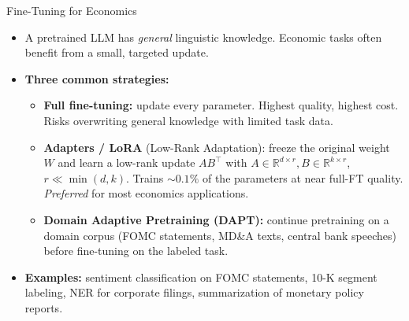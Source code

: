 \documentclass[10pt,english,aspectratio=169]{beamer}
\begin{document}
\begin{frame}{Fine-Tuning for Economics}
\begin{itemize}
\item A pretrained LLM has \emph{general} linguistic knowledge. Economic tasks often benefit from a small, targeted update.

\medskip
\item \textbf{Three common strategies:}
\begin{itemize}
    \item \textbf{Full fine-tuning:} update every parameter. Highest quality, highest cost. Risks overwriting general knowledge with limited task data.
    \medskip
    \item \textbf{Adapters / LoRA} (Low-Rank Adaptation): freeze the original weight $W$ and learn a low-rank update $A B^{\top}$ with $A \in \mathbb{R}^{d \times r}, B \in \mathbb{R}^{k \times r}$, $r \ll \min(d,k)$. Trains $\sim 0.1\%$ of the parameters at near full-FT quality. \emph{Preferred} for most economics applications.
    \medskip
    \item \textbf{Domain Adaptive Pretraining (DAPT):} continue pretraining on a domain corpus (FOMC statements, MD\&A texts, central bank speeches) before fine-tuning on the labeled task.
\end{itemize}

\medskip
\item \textbf{Examples:} sentiment classification on FOMC statements, 10-K segment labeling, NER for corporate filings, summarization of monetary policy reports.
\end{itemize}
\end{frame}
\end{document}
